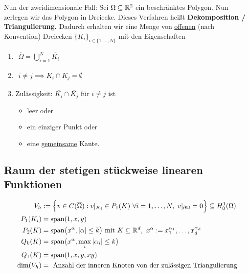 Nun der zweidimensionale Fall: Sei $\Omega\subseteq\mathbb{R}^2$ ein beschränktes Polygon. Nun zerlegen wir das Polygon in Dreiecke. Dieses Verfahren heißt \textbf{Dekomposition / Triangulierung.} Dadurch erhalten wir eine Menge von \underline{offenen} (nach Konvention) Dreiecken $\lbrace K_i\rbrace_{i\in\lbrace1,\ldots,N\rbrace}$ mit den Eigenschaften
\begin{enumerate}[label=(\roman*)]
\item $\begin{aligned}
\overline{\Omega}=\bigcup\limits_{i=1}^N \overline{K_i}
\end{aligned}$
\item $\begin{aligned}
i\neq j\implies K_i\cap K_j=\emptyset
\end{aligned}$
\item Zulässigkeit: $\overline{K_i}\cap\overline{K_j}$ für $i\neq j$ ist
\begin{itemize}
\item leer oder
\item ein einziger Punkt oder
\item eine \ul{gemeinsame} Kante.
\end{itemize}
\end{enumerate}

\subsection*{Raum der stetigen stückweise linearen Funktionen}
\begin{align*}
V_h&:=\Big\lbrace v\in C(\overline{\Omega}) : v|_{K_i}\in P_1(K)~\forall i=1,\ldots,N,~v|_{\partial\Omega}=0\Big\rbrace\subseteq H^1_0(\Omega)\\
P_1(K_i)&=\text{span}(1,x,y)\\
P_2(K)&=\text{span}\big( x^\alpha, |\alpha|\leq k\big)\text{ mit } K\subseteq\mathbb{R}^d,~ x^{\alpha}:=x_1^{\alpha_1},\ldots,x_d^{\alpha_d}\\
Q_k(K)&=\text{span}\big(x^\alpha,\max\limits_i |\alpha_i|\leq k\big)\\
Q_1(K)&=\text{span}(1,x,y,xy)\\
\dim(V_h)&=\text{ Anzahl der inneren Knoten von der zulässigen Triangulierung}\\
\end{align*}

